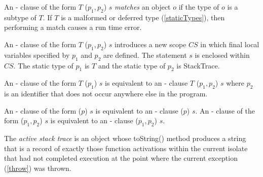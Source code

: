 \documentclass{article}
\newcommand{\code}[1]{{\sf #1}}
\begin{document}
\LMHash{}
An \ON{}-\CATCH{} clause of the form   \code{\ON{} $T$ \CATCH{} ($p_1, p_2$) $s$}  {\em matches} an object $o$  if the type of $o$ is a subtype of $T$.  If $T$ is a malformed or deferred type  (\ref{staticTypes}), then performing a match causes a run time error.


\LMHash{}
An \ON{}-\CATCH{} clause of the form   \code{\ON{} $T$ \CATCH{} ($p_1, p_2$) $s$} introduces a new scope $CS$ in which final local variables specified by $p_1$ and $p_2$ are defined. The statement $s$ is enclosed within $CS$. The static type of $p_1$ is $T$ and the static type of $p_2$ is \code{StackTrace}.


\LMHash{}
An \ON{}-\CATCH{} clause of the form  \code{\ON{} $T$ \CATCH{} ($p_1$) $s$} is equivalent to an \ON{}-\CATCH{} clause  \code{\ON{} $T$ \CATCH{} ($p_1, p_2$) $s$} where $p_2$ is an identifier that does not occur anywhere else in the program.


\LMHash{}
An \ON{}-\CATCH{} clause of the form  \code{\CATCH{} ($p$) $s$} is equivalent to an \ON{}-\CATCH{} clause  \code{\ON{} \DYNAMIC{} \CATCH{} ($p$) $s$}. An \ON{}-\CATCH{} clause of the form  \code{\CATCH{} ($p_1, p_2$) $s$} is equivalent to an \ON{}-\CATCH{} clause  \code{\ON{} \DYNAMIC{} \CATCH{} ($p_1, p_2$) $s$}.



\LMHash{}
The {\em active stack trace} is an object whose \code{toString()} method produces a string that is a record of exactly those function activations within the current isolate that had not completed execution at the point where the current exception (\ref{throw}) was thrown.

\end{document}
